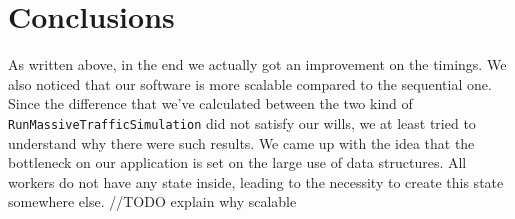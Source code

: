 \documentclass[12pt, a4paper]{report}
\begin{document}
\chapter{Conclusions}
As written above, in the end we actually got an improvement on the timings. We also noticed that our software is more scalable compared to the sequential one. Since the difference that we've calculated between the two kind of \texttt{RunMassiveTrafficSimulation} did not satisfy our wills, we at least tried to understand why there were such results. We came up with the idea that the bottleneck on our application is set on the large use of data structures. All workers do not have any state inside, leading to the necessity to create this state somewhere else.
//TODO explain why scalable



\end{document}
